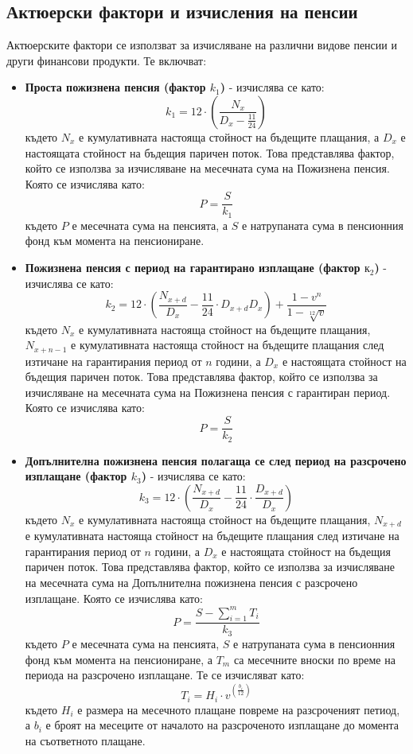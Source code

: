 \documentclass[a4paper,12pt]{article}
\begin{document}
\subsection{Актюерски фактори и изчисления на пенсии}
Актюерските фактори се използват за изчисляване на различни видове пенсии и други финансови продукти. Те включват:
\begin{itemize}
        \item \textbf{Проста пожизнена пенсия (фактор $k_1$)} - изчислява се като:
              \[k_1 = 12\cdot\left(\frac{N_{x}}{D_{x}-\frac{11}{24}}\right)\]
              където $N_x$ е кумулативната настояща стойност на бъдещите плащания, а $D_x$ е настоящата стойност на бъдещия паричен поток. Това представлява фактор, който се използва за изчисляване на месечната сума на Пожизнена пенсия. Която се изчислява като:
              \[P = \frac{S}{k_1}\]
              където $P$ е месечната сума на пенсията, а $S$ е натрупаната сума в пенсионния фонд към момента на пенсиониране.
        \item \textbf{Пожизнена пенсия с  период на гарантирано изплащане (фактор $к_2$)} - изчислява се като:
              \[k_2 = 12\cdot\left(\frac{N_{x+d}}{D_x} - \frac{11}{24}\cdot D_{x+d}{D_{x}}\right)+\frac{1-v^n}{1-\sqrt[12]{v}}\]
              където $N_x$ е кумулативната настояща стойност на бъдещите плащания, $N_{x+n-1}$ е кумулативната настояща стойност на бъдещите плащания след изтичане на гарантирания период от $n$ години, а $D_x$ е настоящата стойност на бъдещия паричен поток. Това представлява фактор, който се използва за изчисляване на месечната сума на Пожизнена пенсия с гарантиран период. Която се изчислява като:
              \[P = \frac{S}{k_2}\]
        \item \textbf{Допълнителна пожизнена пенсия полагаща се след период на разсрочено изплащане (фактор $k_3$)} - изчислява се като:
              \[k_3 = 12\cdot\left(\frac{N_{x+d}}{D_{x}} - \frac{11}{24}\cdot\frac{
                              D_{x+d}}{D_{x}}\right)\]
              където $N_x$ е кумулативната настояща стойност на бъдещите плащания, $N_{x+d}$ е кумулативната настояща стойност на бъдещите плащания след изтичане на гарантирания период от $n$ години, а $D_x$ е настоящата стойност на бъдещия паричен поток. Това представлява фактор, който се използва за изчисляване на месечната сума на Допълнителна пожизнена пенсия с разсрочено изплащане. Която се изчислява като:
              \[P = \frac{S-\sum_{i=1}^{m}T_i}{k_3}\]
              където $P$ е месечната сума на пенсията, $S$ е натрупаната сума в пенсионния фонд към момента на пенсиониране, а $T_m$ са месечните вноски по време на периода на разсрочено изплащане. Те се изчисляват като:
              \[T_i= H_i \cdot v^{(\frac{b_i}{12})}\]
              където $H_i$ е размера на месечното плащане повреме на разсроченият петиод, а $b_i$ е броят на месеците от началото на разсроченото изплащане до момента на съответното плащане.
\end{itemize}
\newpage
\end{document}
